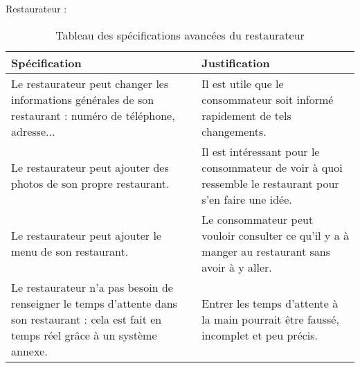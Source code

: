 Restaurateur : \\

\begin{table}[H]
    \centering
    \caption{Tableau des spécifications avancées du restaurateur}
    \label{min-spec-table}
    \begin{tabular}{p{8cm}|p{8cm}}
        \bf{Spécification} & \bf{Justification} \\ \hline
            Le restaurateur peut changer les informations générales de son restaurant : numéro de téléphone, adresse... & Il est utile que le consommateur soit informé rapidement de tels changements. \\ \hline
            Le restaurateur peut ajouter des photos de son propre restaurant. & Il est intéressant pour le consommateur de voir à quoi ressemble le restaurant pour s'en faire une idée. \\ \hline
            Le restaurateur peut ajouter le menu de son restaurant. & Le consommateur peut vouloir consulter ce qu'il y a à manger au restaurant sans avoir à y aller. \\ \hline
            Le restaurateur n'a pas besoin de renseigner le temps d'attente dans son restaurant : cela est fait en temps réel grâce à un système annexe. & Entrer les temps d'attente à la main pourrait être faussé, incomplet et peu précis. \\
    \end{tabular}
\end{table}